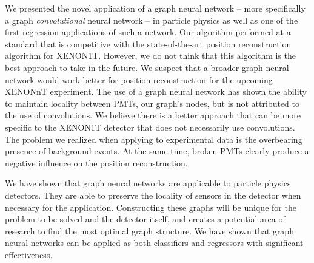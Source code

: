 \documentclass[thesis.tex]{subfiles}
\begin{document}
We presented the novel application of a graph neural network -- more specifically a graph \textit{convolutional} neural network -- in particle physics as well as one of the first regression applications of such a network.
Our algorithm performed at a standard that is competitive with the state-of-the-art position reconstruction algorithm for XENON1T.
However, we do not think that this algorithm is the best approach to take in the future.
We suspect that a broader graph neural network would work better for position reconstruction for the upcoming XENONnT experiment.
The use of a graph neural network has shown the ability to maintain locality between PMTs, our graph's nodes, but is not attributed to the use of convolutions.
We believe there is a better approach that can be more specific to the XENON1T detector that does not necessarily use convolutions.
The problem we realized when applying to experimental data is the overbearing presence of background events.
At the same time, broken PMTs clearly produce a negative influence on the position reconstruction.

\par We have shown that graph neural networks are applicable to particle physics detectors.
They are able to preserve the locality of sensors in the detector when necessary for the application.
Constructing these graphs will be unique for the problem to be solved and the detector itself, and creates a potential area of research to find the most optimal graph structure.
We have shown that graph neural networks can be applied as both classifiers and regressors with significant effectiveness.
\end{document}
